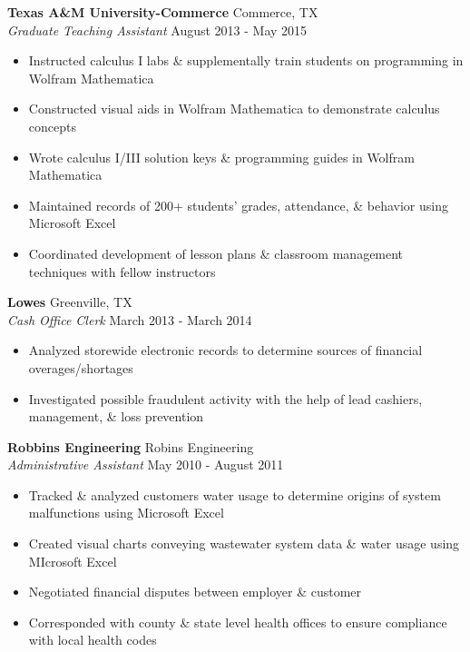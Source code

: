 \documentclass[a4paper]{article}
\begin{document}
\textbf{Texas A\&M University-Commerce} \hfill Commerce, TX\\
\textit{Graduate Teaching Assistant} \hfill August 2013 - May 2015\\
\vspace{-1mm}
\begin{itemize} \itemsep 1pt
	\item Instructed calculus I labs \& supplementally train students on programming in Wolfram Mathematica
	\item Constructed visual aids in Wolfram Mathematica to demonstrate calculus concepts
	\item Wrote calculus I/III solution keys \& programming guides in Wolfram Mathematica
	\item Maintained records of 200+ students’ grades, attendance, \& behavior using Microsoft Excel
	\item Coordinated development of lesson plans \& classroom management techniques with fellow instructors
\end{itemize}
\textbf{Lowe\textquotesingle{}s} \hfill Greenville, TX\\
\textit{Cash Office Clerk} \hfill March 2013 - March 2014\\
\vspace{-1mm}
\begin{itemize} \itemsep 1pt
	\item Analyzed storewide electronic records to determine sources of financial overages/shortages
	\item Investigated possible fraudulent activity with the help of lead cashiers, management, \& loss prevention
\end{itemize}
\textbf{Robbins Engineering} \hfill Robin\textquotesingle{}s Engineering\\
\textit{Administrative Assistant} \hfill May 2010 - August 2011\\
\vspace{-1mm}
\begin{itemize} \itemsep 1pt
	\item Tracked \& analyzed customers\textquotesingle{} water usage to determine origins of system malfunctions using Microsoft Excel
	\item Created visual charts conveying wastewater system data \& water usage using MIcrosoft Excel
	\item Negotiated financial disputes between employer \& customer
	\item Corresponded with county \& state level health offices to ensure compliance with local health codes
\end{itemize}
\end{document}
